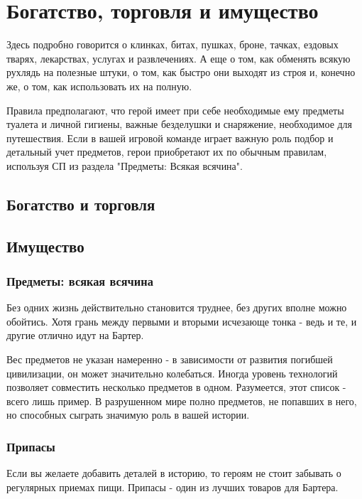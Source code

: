 \chapter{Богатство, торговля и имущество}
Здесь подробно говорится о клинках, битах, пушках, броне, тачках, ездовых тварях, лекарствах, услугах и развлечениях. А еще о том, как обменять всякую рухлядь на полезные штуки, о том, как быстро они выходят из строя и, конечно же, о том, как использовать их на полную.
\begin{tcolorbox}
    Правила предполагают, что герой имеет при себе необходимые ему предметы туалета и личной гигиены, важные безделушки и снаряжение, необходимое для путешествия. Если в вашей игровой команде играет важную роль подбор и детальный учет предметов, герои приобретают их по обычным правилам, используя СП из раздела "Предметы: Всякая всячина".
\end{tcolorbox}

\section{Богатство и торговля}

\section{Имущество}






\subsection{Предметы: всякая всячина}
Без одних жизнь действительно становится труднее, без других вполне можно обойтись. Хотя грань между первыми и вторыми исчезающе тонка - ведь и те, и другие отлично идут на Бартер.
\begin{tcolorbox}
    Вес предметов не указан намеренно - в зависимости от развития погибшей цивилизации, он может значительно колебаться. Иногда уровень технологий позволяет совместить несколько предметов в одном.
    \newline Разумеется, этот список - всего лишь пример. В разрушенном мире полно предметов, не попавших в него, но способных сыграть значимую роль в вашей истории.
\end{tcolorbox}

\subsection{Припасы}
Если вы желаете добавить деталей в историю, то героям не стоит забывать о регулярных приемах пищи. Припасы - один из лучших товаров для Бартера. 
